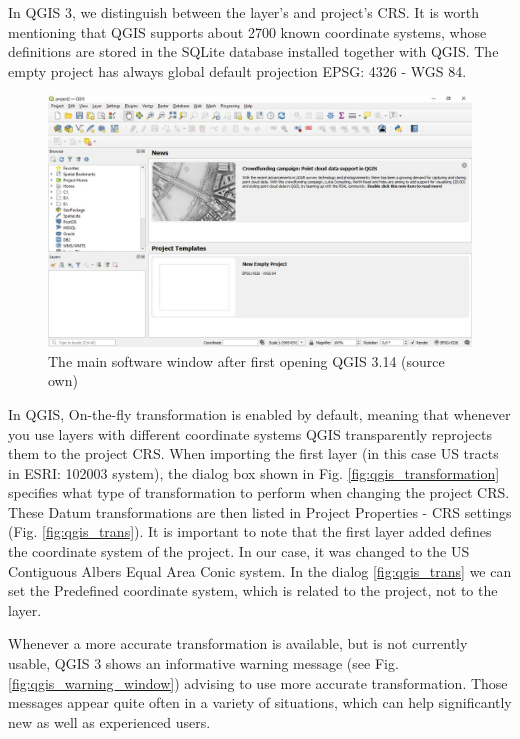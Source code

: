 \documentclass[a4paper,10pt,twoside]{article}
\begin{document}
In QGIS 3, we distinguish between the layer's and project's CRS. It is worth mentioning that QGIS supports about 2700 known coordinate systems, whose definitions are stored in the SQLite database installed together with QGIS. The empty project has always global default projection EPSG: 4326 - WGS 84.

\vspace{0.3cm}
\begin{figure}[hbt!] 
\begin{center}
\includegraphics[width=17cm]{../pictures/qgis_first_window.JPG} 
\caption[The main software window after first opening QGIS 3.14 (source own)]{The main software window after first opening QGIS 3.14 (source own)}
\label{fig:qgis_first_window}
\end{center}
\end{figure}

\noindent In QGIS, On-the-fly transformation is enabled by default, meaning that whenever you use layers with different coordinate systems QGIS transparently reprojects them to the project CRS. When importing the first layer (in this case US tracts in ESRI: 102003 system), the dialog box shown in Fig. \ref{fig:qgis_transformation} specifies what type of transformation to perform when changing the project CRS. These Datum transformations are then listed in Project Properties - CRS settings (Fig. \ref{fig:qgis_trans}). It is important to note that the first layer added defines the coordinate system of the project. In our case, it was changed to the US Contiguous Albers Equal Area Conic system. In the dialog \ref{fig:qgis_trans} we can set the Predefined coordinate system, which is related to the project, not to the layer.

Whenever a more accurate transformation is available, but is not currently usable, QGIS 3 shows an informative warning message (see Fig. \ref{fig:qgis_warning_window}) advising to use more accurate transformation. Those messages appear quite often in a variety of situations, which can help significantly new as well as experienced users.
\end{document}

